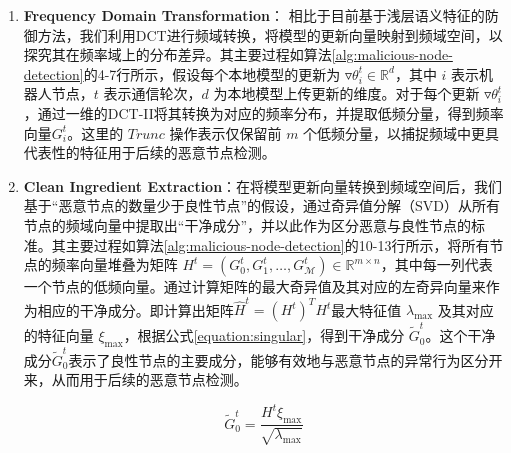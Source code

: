 \documentclass[lettersize,journal]{IEEEtran}
\begin{document}
\begin{enumerate}
\item \textbf{Frequency Domain Transformation}：
相比于目前基于浅层语义特征的防御方法，我们利用DCT进行频域转换，将模型的更新向量映射到频域空间，以探究其在频率域上的分布差异。其主要过程如算法\ref{alg:malicious-node-detection}的4-7行所示，假设每个本地模型的更新为 \(\triangledown \theta_i^t \in \mathbb{R}^d\)，其中 \(i\) 表示机器人节点，\(t\) 表示通信轮次，\(d\) 为本地模型上传更新的维度。对于每个更新 \(\triangledown \theta_i^t\)，通过一维的DCT-II将其转换为对应的频率分布，并提取低频分量，得到频率向量\(G_i^t\)。这里的 $Trunc$ 操作表示仅保留前 $m$ 个低频分量，以捕捉频域中更具代表性的特征用于后续的恶意节点检测。




\item \textbf{Clean Ingredient Extraction}：在将模型更新向量转换到频域空间后，我们基于“恶意节点的数量少于良性节点”的假设，通过奇异值分解（SVD）从所有节点的频域向量中提取出“干净成分”，并以此作为区分恶意与良性节点的标准。其主要过程如算法\ref{alg:malicious-node-detection}的10-13行所示，将所有节点的频率向量堆叠为矩阵 \(H^t = ({G_0^t}, {G_1^t}, \ldots, {G_{\mathcal{M}}^t}) \in \mathbb{R}^{m \times n}\)，其中每一列代表一个节点的低频向量。通过计算矩阵的最大奇异值及其对应的左奇异向量来作为相应的干净成分。即计算出矩阵\(\hat{H}^t = (H^t)^{T} H^t\)最大特征值 \(\lambda_{\text{max}}\) 及其对应的特征向量 \(\xi_{\text{max}}\)，根据公式\ref{equation:singular}，得到干净成分 \(\tilde{G}_0^t\)。这个干净成分\(\tilde{G}_0^t\)表示了良性节点的主要成分，能够有效地与恶意节点的异常行为区分开来，从而用于后续的恶意节点检测。

\begin{equation}
\tilde{G}^t_0 = \frac{H^t \xi_{\text{max}}}{\sqrt{\lambda_{\text{max}}}}
\label{equation:singular}
\end{equation}



\end{enumerate}
\end{document}
